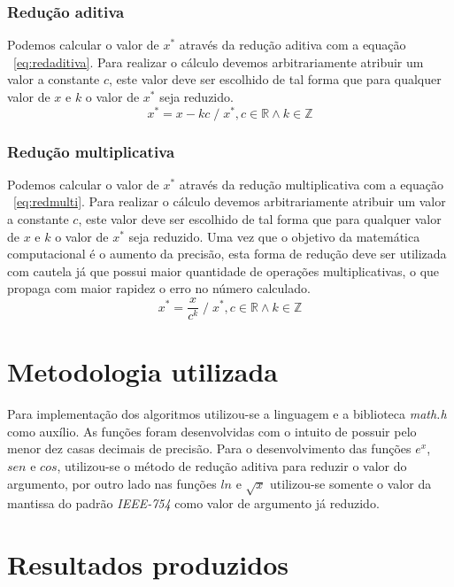 \documentclass[12pt]{article}
\begin{document}
\subsubsection{Redução aditiva}
Podemos calcular o valor de $x^*$ através da redução aditiva com a equação ~\ref{eq:redaditiva}. Para realizar o cálculo devemos arbitrariamente atribuir um valor a constante $c$, este valor deve ser escolhido de tal forma que para qualquer valor de $x$ e $k$ o valor de $x^*$ seja reduzido.
\begin{equation}\label{eq:redaditiva}
    x^* = x - kc \;/\; x^*,c \in \mathbb{R} \land k \in \mathbb{Z}
\end{equation}

\subsubsection{Redução multiplicativa}
Podemos calcular o valor de $x^*$ através da redução multiplicativa com a equação ~\ref{eq:redmulti}. Para realizar o cálculo devemos arbitrariamente atribuir um valor a constante $c$, este valor deve ser escolhido de tal forma que para qualquer valor de $x$ e $k$ o valor de $x^*$ seja reduzido. Uma vez que o objetivo da matemática computacional é o aumento da precisão, esta forma de redução deve ser utilizada com cautela já que possui maior quantidade de operações multiplicativas, o que propaga com maior rapidez o erro no número calculado.
\begin{equation}\label{eq:redmulti}
x^* = \frac{x}{c^{k}} \;/\; x^*,c \in \mathbb{R} \land k \in \mathbb{Z}
\end{equation}

\section{Metodologia utilizada}

Para implementação dos algoritmos utilizou-se a linguagem e a biblioteca \textit{math.h} como auxílio. As funções foram desenvolvidas com o intuito de possuir pelo menor dez casas decimais de precisão. Para o desenvolvimento das funções $e^x$, $sen$ e $cos$, utilizou-se o método de redução aditiva para reduzir o valor do argumento, por outro lado nas funções $ln$ e $\sqrt{x}$ utilizou-se somente o valor da mantissa do padrão \textit{IEEE-754} como valor de argumento já reduzido.

\section{Resultados produzidos}
\end{document}
